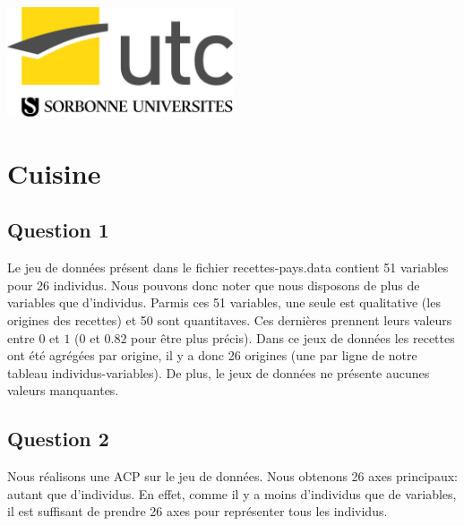 \documentclass[a4paper,11pt,oneside,roman]{article}
\begin{document}
\begin{titlepage}
        
        \includegraphics[width=0.5\textwidth]{imgs/logo_UTC_SU.jpg}\\[1cm] %
        
    
        \vfill %
        
    \end{titlepage}
    
    
    \pagebreak
        
    \section{Cuisine}
    \subsection*{Question 1}
    Le jeu de données présent dans le fichier recettes-pays.data contient 51 variables pour 26 individus.
    Nous pouvons donc noter que nous disposons de plus de variables que d'individus.
    Parmis ces 51 variables, une seule est qualitative (les origines des recettes) et 50 sont quantitaves.
    Ces dernières prennent leurs valeurs entre $0$ et $1$ ($0$ et $0.82$ pour être plus précis).
    Dans ce jeux de données les recettes ont été agrégées par origine, il y a donc 26 origines (une par ligne de notre tableau individus-variables).
    De plus, le jeux de données ne présente aucunes valeurs manquantes.
    
    \subsection*{Question 2}
    Nous réalisons une ACP sur le jeu de données. Nous obtenons 26 axes principaux: autant que d'individus.
    En effet, comme il y a moins d'individus que de variables, il est suffisant de prendre 26 axes pour représenter tous les individus.
\end{document}
